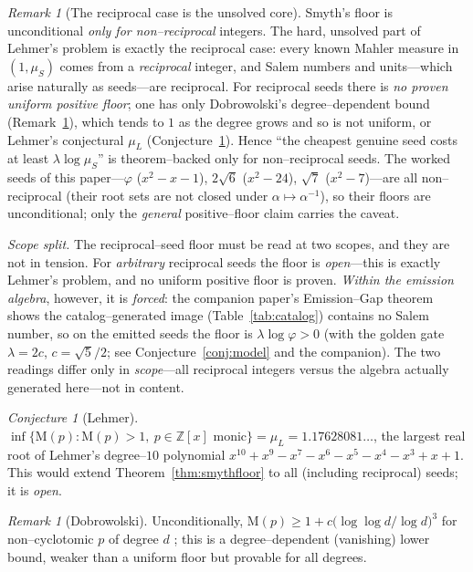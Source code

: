 \documentclass[11pt]{article}
\theoremstyle{plain}
\theoremstyle{definition}
\theoremstyle{remark}
\newtheorem{remark}[theorem]{Remark}
\newtheorem{conjecture}[theorem]{Conjecture}
\newcommand{\Z}{\mathbb{Z}}
\newcommand{\Mah}{\mathrm{M}}
\newcommand{\inv}{^{-1}}
\begin{document}
\begin{remark}[The reciprocal case is the unsolved core]\label{rem:reciprocal}
Smyth's floor is unconditional \emph{only for non--reciprocal} integers. The hard, unsolved part of Lehmer's
problem is exactly the reciprocal case: every known Mahler measure in $(1,\mu_S)$ comes from a
\emph{reciprocal} integer, and Salem numbers and units---which arise naturally as seeds---are reciprocal. For
reciprocal seeds there is \emph{no proven uniform positive floor}; one has only Dobrowolski's
degree--dependent bound (Remark~\ref{rem:dobro}), which tends to $1$ as the degree grows and so is not
uniform, or Lehmer's conjectural $\mu_L$ (Conjecture~\ref{conj:lehmer}). Hence ``the cheapest genuine seed
costs at least $\lambda\log\mu_S$'' is theorem--backed only for non--reciprocal seeds. The worked seeds of
this paper---$\varphi$ ($x^2-x-1$), $2\sqrt6$ ($x^2-24$), $\sqrt7$ ($x^2-7$)---are all non--reciprocal (their
root sets are not closed under $\alpha\mapsto\alpha\inv$), so their floors are unconditional; only the
\emph{general} positive--floor claim carries the caveat.

\emph{Scope split.} The reciprocal--seed floor must be read at two scopes, and they are not in tension.
For \emph{arbitrary} reciprocal seeds the floor is \emph{open}---this is exactly Lehmer's problem, and no
uniform positive floor is proven. \emph{Within the emission algebra}, however, it is \emph{forced}: the
companion paper's Emission--Gap theorem shows the catalog--generated image (Table~\ref{tab:catalog})
contains no Salem number, so on the emitted seeds the floor is $\lambda\log\varphi>0$ (with the golden gate
$\lambda=2c$, $c=\sqrt5/2$; see Conjecture~\ref{conj:model} and the companion). The two readings differ only
in \emph{scope}---all reciprocal integers versus the algebra actually generated here---not in content.
\end{remark}

\begin{conjecture}[Lehmer]\label{conj:lehmer}
$\inf\{\Mah(p):\Mah(p)>1,\ p\in\Z[x]\text{ monic}\}=\mu_L=1.17628081\ldots$, the largest real root of
Lehmer's degree--$10$ polynomial $x^{10}+x^9-x^7-x^6-x^5-x^4-x^3+x+1$. This would extend
Theorem~\ref{thm:smythfloor} to all (including reciprocal) seeds; it is \emph{open}.
\end{conjecture}

\begin{remark}[Dobrowolski]\label{rem:dobro}
Unconditionally, $\Mah(p)\ge 1+c\big(\log\log d/\log d\big)^3$ for non--cyclotomic $p$ of degree $d$
\cite{Dobrowolski}; this is a degree--dependent (vanishing) lower bound, weaker than a uniform floor but
provable for all degrees.
\end{remark}
\end{document}
